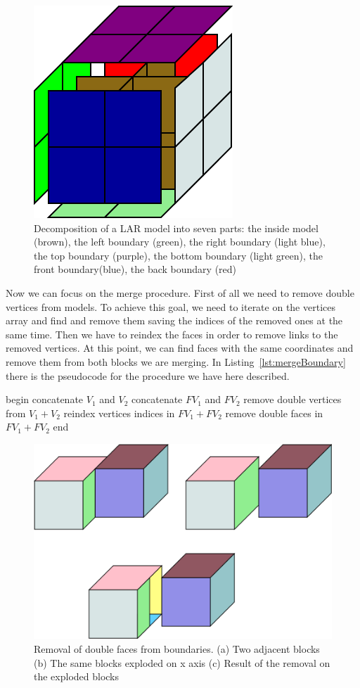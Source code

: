 \begin{figure}[htb] %
   \centering
   \includegraphics[width=0.25\linewidth]{images/boundaries.png}
   \caption[Decomposition of a LAR model into seven parts]{Decomposition of a LAR model into seven parts: the inside model (brown), the left boundary (green), the right boundary (light blue), the top boundary (purple), the bottom boundary (light green), the front boundary(blue), the back boundary (red)}
   \label{fig:boundaries}
\end{figure}

Now we can focus on the merge procedure. First of all we need to remove double vertices from models. To achieve this goal, we need to iterate on the vertices array and find and remove them saving the indices of the removed ones at the same time. Then we have to reindex the faces in order to remove links to the removed vertices. At this point, we can find faces with the same coordinates and remove them from both blocks we are merging. In Listing~\ref{lst:mergeBoundary} there is the pseudocode for the procedure we have here described.

\begin{pseudo}[caption={Merging of two boundaries}, label={lst:mergeBoundary}]
begin
  concatenate $V_1$ and $V_2$
  concatenate $FV_1$ and $FV_2$
  remove double vertices from $V_1 + V_2$
  reindex vertices indices in $FV_1 + FV_2$
  remove double faces in $FV_1 + FV_2$
end
\end{pseudo}

\begin{figure}[htb] %
   \centering
   \includegraphics[width=0.40\linewidth]{images/BoundaryMerge.png}
   \caption[Removal of double faces from boundaries]{Removal of double faces from boundaries. (a) Two adjacent blocks (b) The same blocks exploded on x axis (c) Result of the removal on the exploded blocks}
   \label{fig:boundaryMerge}
\end{figure}

